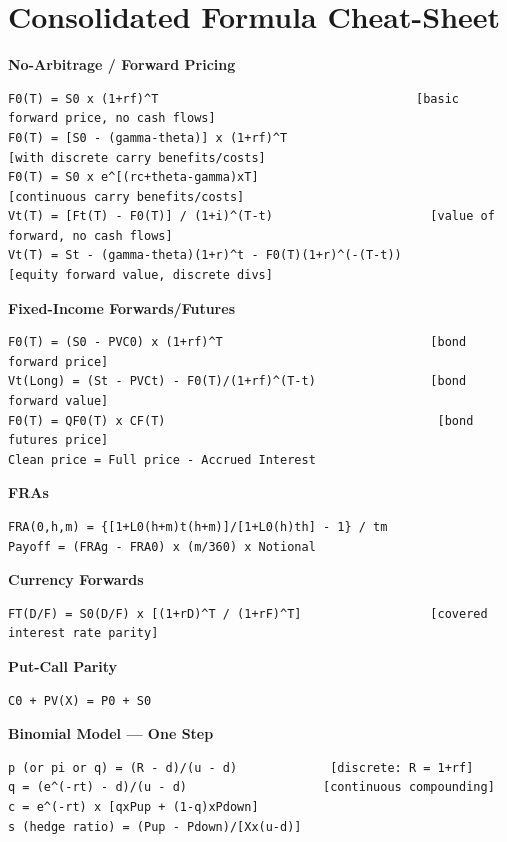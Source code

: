 \documentclass[12pt,openany]{book}
\theoremstyle{definition}
\theoremstyle{remark}
\begin{document}
\section{Consolidated Formula Cheat-Sheet}

\textbf{No-Arbitrage / Forward Pricing}
\begin{lstlisting}[style=notesCode]
F0(T) = S0 x (1+rf)^T                                    [basic forward price, no cash flows]
F0(T) = [S0 - (gamma-theta)] x (1+rf)^T                            [with discrete carry benefits/costs]
F0(T) = S0 x e^[(rc+theta-gamma)xT]                                [continuous carry benefits/costs]
Vt(T) = [Ft(T) - F0(T)] / (1+i)^(T-t)                      [value of forward, no cash flows]
Vt(T) = St - (gamma-theta)(1+r)^t - F0(T)(1+r)^(-(T-t))            [equity forward value, discrete divs]
\end{lstlisting}

\textbf{Fixed-Income Forwards/Futures}
\begin{lstlisting}[style=notesCode]
F0(T) = (S0 - PVC0) x (1+rf)^T                             [bond forward price]
Vt(Long) = (St - PVCt) - F0(T)/(1+rf)^(T-t)                [bond forward value]
F0(T) = QF0(T) x CF(T)                                      [bond futures price]
Clean price = Full price - Accrued Interest
\end{lstlisting}

\textbf{FRAs}
\begin{lstlisting}[style=notesCode]
FRA(0,h,m) = {[1+L0(h+m)t(h+m)]/[1+L0(h)th] - 1} / tm
Payoff = (FRAg - FRA0) x (m/360) x Notional
\end{lstlisting}

\textbf{Currency Forwards}
\begin{lstlisting}[style=notesCode]
FT(D/F) = S0(D/F) x [(1+rD)^T / (1+rF)^T]                  [covered interest rate parity]
\end{lstlisting}

\textbf{Put-Call Parity}
\begin{lstlisting}[style=notesCode]
C0 + PV(X) = P0 + S0
\end{lstlisting}

\textbf{Binomial Model — One Step}
\begin{lstlisting}[style=notesCode]
p (or pi or q) = (R - d)/(u - d)             [discrete: R = 1+rf]
q = (e^(-rt) - d)/(u - d)                   [continuous compounding]
c = e^(-rt) x [qxPup + (1-q)xPdown]
s (hedge ratio) = (Pup - Pdown)/[Xx(u-d)]
\end{lstlisting}
\end{document}
